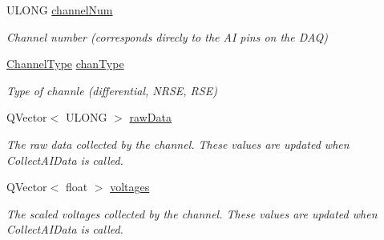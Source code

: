 \begin{DoxyCompactItemize}
\item 
\hypertarget{struct_picto_1_1_picto_box_daq_board_1_1ai_channel__st_a0520d55865bc2d94fe75a8543000c1f7}{U\-L\-O\-N\-G \hyperlink{struct_picto_1_1_picto_box_daq_board_1_1ai_channel__st_a0520d55865bc2d94fe75a8543000c1f7}{channel\-Num}}\label{struct_picto_1_1_picto_box_daq_board_1_1ai_channel__st_a0520d55865bc2d94fe75a8543000c1f7}

\begin{DoxyCompactList}\small\item\em Channel number (corresponds direcly to the A\-I pins on the D\-A\-Q) \end{DoxyCompactList}\item 
\hypertarget{struct_picto_1_1_picto_box_daq_board_1_1ai_channel__st_a382a425ae4a69995ab7e10aa1667d959}{\hyperlink{class_picto_1_1_picto_box_daq_board_a360f27f60651ecf404df481d9e214839}{Channel\-Type} \hyperlink{struct_picto_1_1_picto_box_daq_board_1_1ai_channel__st_a382a425ae4a69995ab7e10aa1667d959}{chan\-Type}}\label{struct_picto_1_1_picto_box_daq_board_1_1ai_channel__st_a382a425ae4a69995ab7e10aa1667d959}

\begin{DoxyCompactList}\small\item\em Type of channle (differential, N\-R\-S\-E, R\-S\-E) \end{DoxyCompactList}\item 
\hypertarget{struct_picto_1_1_picto_box_daq_board_1_1ai_channel__st_a72e88100b6d85ea5220c01f65fddd5e9}{Q\-Vector$<$ U\-L\-O\-N\-G $>$ \hyperlink{struct_picto_1_1_picto_box_daq_board_1_1ai_channel__st_a72e88100b6d85ea5220c01f65fddd5e9}{raw\-Data}}\label{struct_picto_1_1_picto_box_daq_board_1_1ai_channel__st_a72e88100b6d85ea5220c01f65fddd5e9}

\begin{DoxyCompactList}\small\item\em The raw data collected by the channel. These values are updated when Collect\-A\-I\-Data is called. \end{DoxyCompactList}\item 
\hypertarget{struct_picto_1_1_picto_box_daq_board_1_1ai_channel__st_a9dd5edf974b82d9c24100f8eb0434f3d}{Q\-Vector$<$ float $>$ \hyperlink{struct_picto_1_1_picto_box_daq_board_1_1ai_channel__st_a9dd5edf974b82d9c24100f8eb0434f3d}{voltages}}\label{struct_picto_1_1_picto_box_daq_board_1_1ai_channel__st_a9dd5edf974b82d9c24100f8eb0434f3d}

\begin{DoxyCompactList}\small\item\em The scaled voltages collected by the channel. These values are updated when Collect\-A\-I\-Data is called. \end{DoxyCompactList}\end{DoxyCompactItemize}


